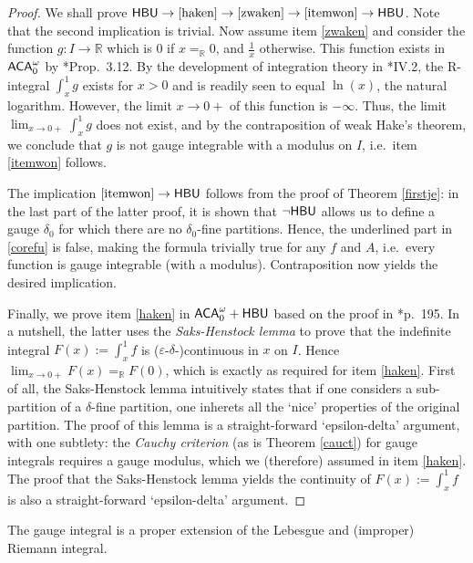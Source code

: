 \documentclass[reqno]{amsart}
\def\ACAo{\textup{\textsf{ACA}}_{0}^{\omega}}
\def\R{{\mathbb  R}}
\def\di{\rightarrow}
\def\ACA{\textup{\textsf{ACA}}}
\def\HBU{\textup{\textsf{HBU}}}
\def\eps{\varepsilon}
\numberwithin{equation}{section}
\numberwithin{thm}{section}
\begin{document}
\begin{proof}
We shall prove $\HBU\di \eqref{haken}\di \eqref{zwaken}\di \eqref{itemwon} \di \HBU$.  Note that the second implication is trivial.   Now assume item \eqref{zwaken} and consider the function $g:I\di \R$ which is $0$ if $x=_{\R}0$, and $\frac{1}{x}$ otherwise.  This function exists in $\ACA_{0}^{\omega}$ by \cite{kohlenbach2}*{Prop.~3.12}.  By the development of integration theory in \cite{simpson2}*{IV.2}, the R-integral $\int_{x}^{1}g$ exists for $x>0$ and is readily seen to equal $\ln(x)$, the natural logarithm.  However, the limit $x\di 0+$ of this function is $-\infty$.  Thus, the limit $\lim_{x\di 0+}\int_{x}^{1}g $ does not exist, and by the contraposition of weak Hake's theorem, we conclude that $g$ is not gauge integrable with a modulus on $I$, i.e.\ item \eqref{itemwon} follows.  

\smallskip      

The implication $ \eqref{itemwon}\di \HBU$ follows from the proof of Theorem \ref{firstje}:  in the last part of the latter proof, it is shown
that $\neg\HBU$ allows us to define a gauge $\delta_{0}$ for which there are no $\delta_{0}$-fine partitions.
Hence, the underlined part in \eqref{corefu} is false, making the formula trivially true for any $f$ and $A$, i.e.\ every function is gauge integrable (with a modulus).
Contraposition now yields the desired implication.  

\smallskip

Finally, we prove item \eqref{haken} in $\ACAo+\HBU$ based on the proof in \cite{bartle}*{p.\ 195}.  
In a nutshell, the latter uses the \emph{Saks-Henstock lemma} to prove that the indefinite integral $F(x):=\int_{x}^{1}f$ is ($\eps$-$\delta$-)continuous in $x$ on $I$.        
Hence $\lim_{x\di0+}F(x)=_{\R}F(0)$, which is exactly as required for item \eqref{haken}.  First of all, the Saks-Henstock lemma intuitively states that if one considers a sub-partition 
of a $\delta$-fine partition, one inherets all the `nice' properties of the original partition.  The proof of this lemma is a straight-forward `epsilon-delta' argument, with one subtlety: the \emph{Cauchy criterion} (as is Theorem \ref{cauct}) for gauge integrals requires a gauge modulus, which we (therefore) assumed in item \eqref{haken}.  
The proof that the Saks-Henstock lemma yields the continuity of $F(x):=\int_{x}^{1}f$ is also a straight-forward `epsilon-delta' argument.    
\end{proof}
The gauge integral is a proper extension of the Lebesgue and (improper) Riemann integral.  
\end{document}
